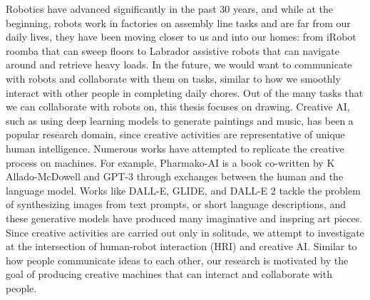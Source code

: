 
 
Robotics have advanced significantly in the past 30 years, and while at the beginning, robots work in factories on assembly line tasks and are far from our daily lives, they have been moving closer to us and into our homes: from iRobot roomba that can sweep floors to Labrador assistive robots that can navigate around and retrieve heavy loads. 
In the future, we would want to communicate with robots and collaborate with them on tasks, similar to how we smoothly interact with other people in completing daily chores.   
Out of the many tasks that we can collaborate with robots on, this thesis focuses on drawing. 
Creative AI, such as using deep learning models to generate paintings and music, has been a popular research domain, since creative activities are representative of unique human intelligence. 
Numerous works have attempted to replicate the creative process on machines.
For example, Pharmako-AI \citep{allado-mcdowell_okojie_2020} is a book co-written by K Allado-McDowell and GPT-3 \citep{gpt3} through exchanges between the human and the language model. 
Works like DALL-E, GLIDE, and DALL-E 2 tackle the problem of synthesizing images from text prompts, or short language descriptions, and these generative models have produced many imaginative and inspring art pieces. 
Since creative activities are carried out only in solitude, we attempt to investigate at the intersection of human-robot interaction (HRI) and creative AI. 
Similar to how people communicate ideas to each other, our research is motivated by the goal of producing creative machines that can interact and collaborate with people. 


